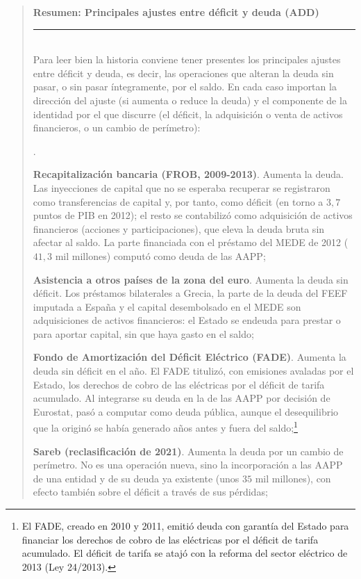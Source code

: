\documentclass[10pt,a4paper]{article}
\newcounter{numitem}
\newenvironment{lnum}
      {\begin{list}{\arabic{numitem}.}{%
          \usecounter{numitem}%
          \setlength{\leftmargin}{1cm}%
          \setlength{\parskip}{3pt}%
          \setlength{\itemsep}{0pt}%
          \setlength{\parsep}{0pt}%
      }}
      {\end{list}}
\newenvironment{specialblock}[1]{%
      \begin{quote} %
      \small %
      \noindent\textbf{#1}\\[-0.3em] %
      \rule{\linewidth}{0.4pt}\\[0.6em]}{
      \end{quote}}
\begin{document}
\begin{specialblock}{\textbf{Resumen}: Principales ajustes entre déficit y deuda (ADD)}
    Para leer bien la historia conviene tener presentes los principales ajustes entre déficit y deuda, es decir, las operaciones que alteran la deuda sin pasar, o sin pasar íntegramente, por el saldo. En cada caso importan la dirección del ajuste (si aumenta o reduce la deuda) y el componente de la identidad por el que discurre (el déficit, la adquisición o venta de activos financieros, o un cambio de perímetro):
    \begin{lnum}
        \item \textbf{Recapitalización bancaria (FROB, 2009-2013)}. Aumenta la deuda. Las inyecciones de capital que no se esperaba recuperar se registraron como transferencias de capital y, por tanto, como déficit (en torno a $3,7$ puntos de PIB en 2012); el resto se contabilizó como adquisición de activos financieros (acciones y participaciones), que eleva la deuda bruta sin afectar al saldo. La parte financiada con el préstamo del MEDE de 2012 ($41,3$ mil millones) computó como deuda de las AAPP;
        \item \textbf{Asistencia a otros países de la zona del euro}. Aumenta la deuda sin déficit. Los préstamos bilaterales a Grecia, la parte de la deuda del FEEF imputada a España y el capital desembolsado en el MEDE son adquisiciones de activos financieros: el Estado se endeuda para prestar o para aportar capital, sin que haya gasto en el saldo;
        \item \textbf{Fondo de Amortización del Déficit Eléctrico (FADE)}. Aumenta la deuda sin déficit en el año. El FADE titulizó, con emisiones avaladas por el Estado, los derechos de cobro de las eléctricas por el déficit de tarifa acumulado. Al integrarse su deuda en la de las AAPP por decisión de Eurostat, pasó a computar como deuda pública, aunque el desequilibrio que la originó se había generado años antes y fuera del saldo;\footnote{%
            El FADE, creado en 2010 y 2011, emitió deuda con garantía del Estado para financiar los derechos de cobro de las eléctricas por el déficit de tarifa acumulado. El déficit de tarifa se atajó con la reforma del sector eléctrico de 2013 (Ley 24/2013).
        }
        \item \textbf{Sareb (reclasificación de 2021)}. Aumenta la deuda por un cambio de perímetro. No es una operación nueva, sino la incorporación a las AAPP de una entidad y de su deuda ya existente (unos $35$ mil millones), con efecto también sobre el déficit a través de sus pérdidas;

\end{lnum}
\end{specialblock}
\end{document}
